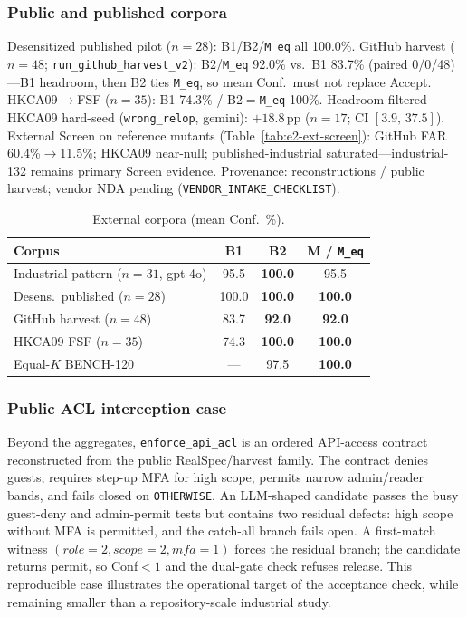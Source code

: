\documentclass[10pt,conference]{IEEEtran}
\begin{document}
\subsubsection{Public and published corpora}
\label{sec:ext}
Desensitized published pilot ($n{=}28$): B1/B2/\texttt{M\_eq} all 100.0\%.
GitHub harvest ($n{=}48$; \texttt{run\_github\_harvest\_v2}): B2/\texttt{M\_eq}
92.0\% vs.\ B1 83.7\% (paired 0/0/48)---B1 headroom, then B2 ties
\texttt{M\_eq}, so mean Conf.\ must not replace Accept.
HKCA09$\rightarrow$FSF ($n{=}35$): B1 74.3\% / B2${=}$\texttt{M\_eq} 100\%.
Headroom-filtered HKCA09 hard-seed (\texttt{wrong\_relop}, gemini):
${+}18.8$\,pp ($n{=}17$; CI $[3.9,\,37.5]$).
External Screen on reference mutants
(Table~\ref{tab:e2-ext-screen}): GitHub FAR 60.4\%$\rightarrow$11.5\%;
HKCA09 near-null; published-industrial saturated---industrial-132 remains
primary Screen evidence.
Provenance: reconstructions / public harvest; vendor NDA pending
(\texttt{VENDOR\_INTAKE\_CHECKLIST}).

\begin{table}[t]
\centering
\caption{External corpora (mean Conf.\ \%).}
\label{tab:ext}
\footnotesize
\begin{tabular}{lccc}
\toprule
Corpus & B1 & B2 & M / \texttt{M\_eq} \\
\midrule
Industrial-pattern ($n{=}31$, gpt-4o) & 95.5 & \textbf{100.0} & 95.5 \\
Desens.\ published ($n{=}28$) & 100.0 & \textbf{100.0} & \textbf{100.0} \\
GitHub harvest ($n{=}48$) & 83.7 & \textbf{92.0} & \textbf{92.0} \\
HKCA09 FSF ($n{=}35$) & 74.3 & \textbf{100.0} & \textbf{100.0} \\
Equal-$K$ BENCH-120 & --- & 97.5 & \textbf{100.0} \\
\bottomrule
\end{tabular}
\end{table}



\subsubsection{Public ACL interception case}
Beyond the aggregates, \texttt{enforce\_api\_acl} is an ordered API-access
contract reconstructed from the public RealSpec/harvest family.
The contract denies guests, requires
step-up MFA for high scope, permits narrow admin/reader bands, and fails closed
on \texttt{OTHERWISE}.
An LLM-shaped candidate passes the busy guest-deny and
admin-permit tests but contains two residual defects: high scope without MFA
is permitted, and the catch-all branch fails open.
A first-match witness
$(\mathit{role}{=}2,\mathit{scope}{=}2,\mathit{mfa}{=}1)$ forces the residual
branch; the candidate returns permit, so Conf${<}1$ and the dual-gate check
refuses release.
This reproducible case illustrates the operational target of
the acceptance check, while remaining smaller than a repository-scale industrial
study.
\end{document}
